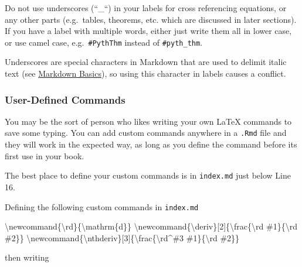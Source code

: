 \documentclass[
  letterpaper,
  oneside]{book}
\newenvironment{Shaded}{\begin{snugshade}}{\end{snugshade}}
\newcommand{\ExtensionTok}[1]{\textcolor[rgb]{0.00,0.23,0.31}{#1}}
\newcommand{\FunctionTok}[1]{\textcolor[rgb]{0.28,0.35,0.67}{#1}}
\newcommand{\NormalTok}[1]{\textcolor[rgb]{0.00,0.23,0.31}{#1}}
\numberwithin{equation}{section}
\numberwithin{figure}{section}
\theoremstyle{break}
\theoremstyle{plain}
\theoremstyle{remark}
\begin{document}
Do not use underscores (``\_``) in your labels for cross referencing
equations, or any other parts (e.g.~tables, theorems, etc. which are
discussed in later sections). If you have a label with multiple words,
either just write them all in lower case, or use camel case,
e.g.~\texttt{\#PythThm} instead of \texttt{\#pyth\_thm}.

Underscores are special characters in Markdown that are used to delimit
italic text (see \hyperref[markdown-basics]{Markdown Basics}), so using
this character in labels causes a conflict.

\subsubsection*{User-Defined Commands}\label{user-defined-commands}

You may be the sort of person who likes writing your own LaTeX commands
to save some typing. You can add custom commands anywhere in a
\texttt{.Rmd} file and they will work in the expected way, as long as
you define the command before its first use in your book.

The best place to define your custom commands is in \texttt{index.md}
just below Line 16.

Defining the following custom commands in \texttt{index.md}

\begin{Shaded}
\begin{Highlighting}[]
\FunctionTok{\textbackslash{}newcommand}\NormalTok{\{}\ExtensionTok{\textbackslash{}rd}\NormalTok{\}\{}\FunctionTok{\textbackslash{}mathrm}\NormalTok{\{d\}\}}
\FunctionTok{\textbackslash{}newcommand}\NormalTok{\{}\ExtensionTok{\textbackslash{}deriv}\NormalTok{\}[2]\{}\FunctionTok{\textbackslash{}frac}\NormalTok{\{}\FunctionTok{\textbackslash{}rd}\NormalTok{ \#1\}\{}\FunctionTok{\textbackslash{}rd}\NormalTok{ \#2\}\}}
\FunctionTok{\textbackslash{}newcommand}\NormalTok{\{}\ExtensionTok{\textbackslash{}nthderiv}\NormalTok{\}[3]\{}\FunctionTok{\textbackslash{}frac}\NormalTok{\{}\FunctionTok{\textbackslash{}rd}\NormalTok{\^{}\#3 \#1\}\{}\FunctionTok{\textbackslash{}rd}\NormalTok{ \#2\}\}}
\end{Highlighting}
\end{Shaded}

\newcommand{\rd}{\mathrm{d}}
\newcommand{\deriv}[2]{\frac{\rd #1}{\rd #2}}
\newcommand{\nthderiv}[3]{\frac{\rd^#3 #1}{\rd #2}}

then writing
\end{document}
